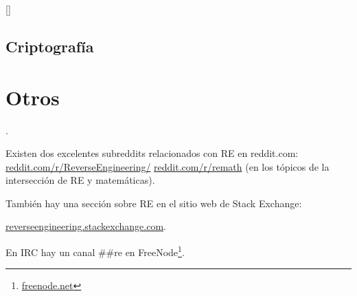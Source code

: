 [\TAOUP]

\section{Criptograf\'ia}



\chapter{Otros}

\HenryWarren.

Existen dos excelentes subreddits relacionados con \ac{RE} en reddit.com:
\href{http://go.yurichev.com/17027}{reddit.com/r/ReverseEngineering/} \ESph{}
\href{http://go.yurichev.com/17028}{reddit.com/r/remath}
(en los t\'opicos de la intersecci\'on de \ac{RE} y matem\'aticas).

Tambi\'en hay una secci\'on sobre \ac{RE} en el sitio web de Stack Exchange:

\par
\href{http://go.yurichev.com/17029}{reverseengineering.stackexchange.com}.

En IRC hay un canal \#\#re en
FreeNode\footnote{\href{http://go.yurichev.com/17030}{freenode.net}}.

